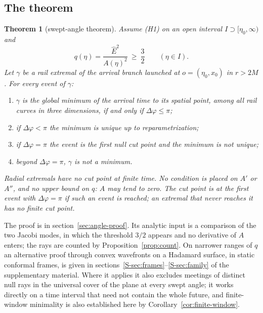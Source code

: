 \documentclass[aip,jmp,amsmath,amssymb,reprint]{revtex4-2}
\newcommand{\Ehat}{\hat E}
\theoremstyle{plain}
\newtheorem{theorem}{Theorem}
\theoremstyle{definition}
\begin{document}
\subsection{The theorem}
\label{sec:angle-thm}
\begin{theorem}[swept-angle theorem]\label{thm:angle}
Assume (H1) on an open interval $I\supset[\eta_0,\infty)$ and
\begin{equation}
  q(\eta)=\frac{\Ehat^2}{A(\eta)^2}\ \ge\ \frac32\qquad(\eta\in I).
  \label{eq:q32}
\end{equation}
Let $\gamma$ be a rail extremal of the arrival branch launched at $o=(\eta_0,x_0)$ in $r>2M$.
For every event of $\gamma$:
\begin{enumerate}
\item $\gamma$ is the global minimum of the arrival time to its spatial point, among all
  rail curves in three dimensions, if and only if $\Delta\varphi\le\pi$;
\item if $\Delta\varphi<\pi$ the minimum is unique up to reparametrization;
\item if $\Delta\varphi=\pi$ the event is the first null cut point and the minimum is not
  unique;
\item beyond $\Delta\varphi=\pi$, $\gamma$ is not a minimum.
\end{enumerate}
Radial extremals have no cut point at finite time. No condition is placed on $A'$ or $A''$,
and no upper bound on $q$: $A$ may tend to zero. The cut point is at the first event with
$\Delta\varphi=\pi$ if such an event is reached; an extremal that never reaches it has no finite
cut point.
\end{theorem}

The proof is in section~\ref{sec:angle-proof}. Its analytic input is a comparison of the two
Jacobi modes, in which the threshold $3/2$ appears and no derivative of $A$ enters; the rays are
counted by Proposition~\ref{prop:count}. On narrower ranges of $q$ an alternative proof through
convex wavefronts on a Hadamard surface, in static conformal frames, is given in
sections~\ref{S-sec:frames}--\ref{S-sec:family} of the supplementary material. Where it applies it also excludes meetings of distinct null rays in the
universal cover of the plane at every swept angle; it works directly on a time interval that
need not contain the whole future, and finite-window minimality is also established here by
Corollary~\ref{cor:finite-window}.
\end{document}
